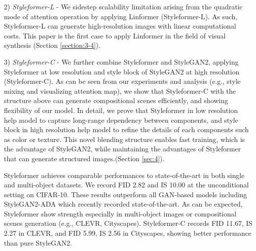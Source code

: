 \documentclass[10pt,twocolumn,letterpaper]{article}
\begin{document}
2) \textit{Styleformer-L} - We sidestep scalability limitation arising from the quadratic mode of attention operation by applying Linformer \cite{wang2020linformer} (Styleformer-L). As such, Styleformer-L can generate high-resolution images with linear computational costs. 
This paper is the first case to apply Linformer in the field of visual synthesis (Section \ref{section:3-4}). 

3) \textit{Styleformer-C} - We further combine Styleformer and StyleGAN2, applying Styleformer at low resolution and style block of StyleGAN2 at high resolution (Styleformer-C). As can be seen from our experiments and analysis (e.g., style mixing and visualizing attention map), we show that Styleformer-C with the structure above can generate compositional scenes efficiently, and showing flexibility of our model. In detail, we prove that Styleformer in low resolution help model to capture long-range dependency between components, and style block in high resolution help model to refine the details of each components such as color or texture. This novel blending structure enables fast training, which is the advantage of StyleGAN2, while maintaining the advantages of Styleformer that can generate structured images.(Section \ref{sec:4}). 

Styleformer achieves comparable performances to state-of-the-art in both single and multi-object datasets.
We record FID 2.82 and IS 10.00 at the unconditional setting on CIFAR-10. These results outperform all GAN-based models including StyleGAN2-ADA \cite{karras2020training} which recently recorded state-of-the-art. As can be expected, Styleformer show strength especially in multi-object images or compositional scenes generation (e.g., CLEVR, Cityscapes).
Styleformer-C records FID 11.67, IS 2.27 in CLEVR, and FID 5.99, IS 2.56 in Cityscapes, showing better performance than pure StyleGAN2. 
\end{document}
